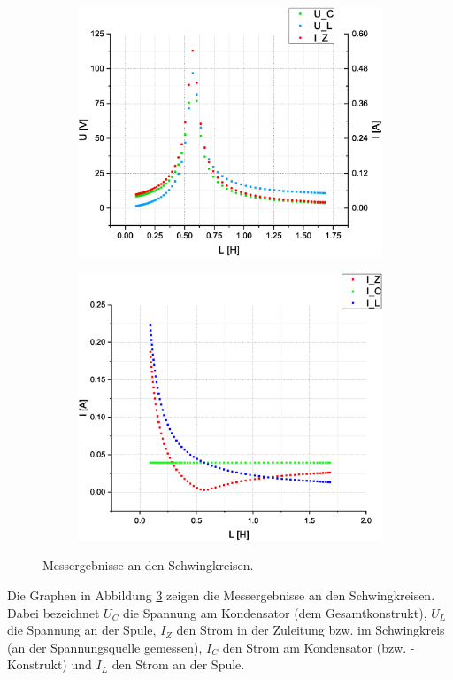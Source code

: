 \documentclass[10pt,a4paper]{article}
\begin{document}
\begin{flushleft}
\begin{itemize}
\begin{figure}[H]
\centering
\begin{subfigure}[c]{.5\textwidth}
\centering
\includegraphics[scale=0.3]{Reihenschwingkreis}
\label{fig:erg_res_reihe}
\end{subfigure}%
%
\begin{subfigure}[c]{.5\textwidth}
\centering
\includegraphics[scale=0.3]{Parallelschwingkreis}
\label{fig:erg_res_para}
\end{subfigure}%

\caption{Messergebnisse an den Schwingkreisen.}
\label{fig:messerg_schwing}
\end{figure}
Die Graphen in Abbildung \ref{fig:messerg_schwing} zeigen die Messergebnisse an den Schwingkreisen. Dabei bezeichnet $U_C$ die Spannung am Kondensator (dem Gesamtkonstrukt), $U_L$ die Spannung an der Spule, $I_Z$ den Strom in der Zuleitung bzw. im Schwingkreis (an der Spannungsquelle gemessen), $I_C$ den Strom am Kondensator (bzw. -Konstrukt) und $I_L$ den Strom an der Spule.
\end{itemize}
\end{flushleft}
\end{document}
